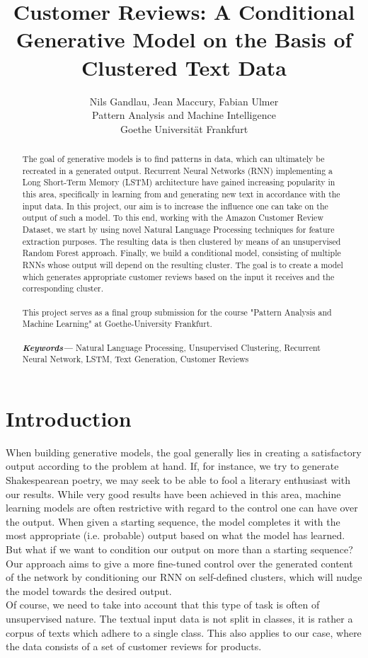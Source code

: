 \documentclass[]{report}
\title{Customer Reviews: A Conditional Generative Model on the Basis of Clustered Text Data}
\author{Nils Gandlau, Jean Maccury, Fabian Ulmer \\
		\small Pattern Analysis and Machine Intelligence \\
		\small Goethe Universität Frankfurt}
\providecommand{\keywords}[1]
{
	\small	
	\textbf{\textit{Keywords---}} #1
}
\begin{document}
\maketitle


\begin{abstract}
	The goal of generative models is to find patterns in data, which can ultimately be recreated in a generated output. Recurrent Neural Networks (RNN) implementing a Long Short-Term Memory (LSTM) architecture have gained increasing popularity in this area, specifically in learning from and generating new text in accordance with the input data. In this project, our aim is to increase the influence one can take on the output of such a model. To this end, working with the Amazon Customer Review Dataset, we start by using novel Natural Language Processing techniques for feature extraction purposes. The resulting data is then clustered by means of an unsupervised Random Forest approach. Finally, we build a conditional model, consisting of multiple RNNs whose output will depend on the resulting cluster. The goal is to create a model which generates appropriate customer reviews based on the input it receives and the corresponding cluster.   \\\\
	This project serves as a final group submission for the course "Pattern Analysis and Machine Learning" at Goethe-University Frankfurt. \\\\
	\keywords{Natural Language Processing, Unsupervised Clustering, Recurrent Neural Network, LSTM, Text Generation, Customer Reviews}	
\end{abstract}

\tableofcontents

\chapter{Introduction}
When building generative models, the goal generally lies in creating a satisfactory output according to the problem at hand. If, for instance, we try to generate Shakespearean poetry, we may seek to be able to fool a literary enthusiast with our results. While very good results have been achieved in this area, %
machine learning models are often restrictive with regard to the control one can have over the output. When given a starting sequence, the model completes it with the most appropriate (i.e. probable) output based on what the model has learned. But what if we want to condition our output on more than a starting sequence? Our approach aims to give a more fine-tuned control over the generated content of the network by conditioning our RNN on self-defined clusters, which will nudge the model towards the desired output. \\
Of course, we need to take into account that this type of task is often of unsupervised nature. The textual input data is not split in classes, it is rather a corpus of texts which adhere to a single class. This also applies to our case, where the data consists of a set of customer reviews for products.
\end{document}
